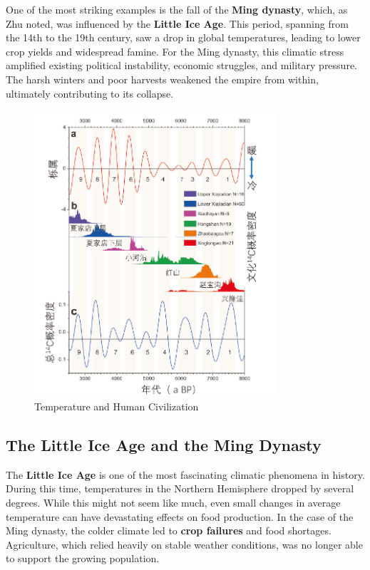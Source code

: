 \documentclass[a4paper]{article} 	%
\begin{document}
One of the most striking examples is the fall of the \textbf{Ming dynasty}, which, as Zhu noted, was influenced by the \textbf{Little Ice Age}. This period, spanning from the 14th to the 19th century, saw a drop in global temperatures, leading to lower crop yields and widespread famine. For the Ming dynasty, this climatic stress amplified existing political instability, economic struggles, and military pressure. The harsh winters and poor harvests weakened the empire from within, ultimately contributing to its collapse.

\begin{figure}[h!]
	\centering
	\includegraphics[width=0.8\textwidth]{fig009.png}  %
	\caption{Temperature and Human Civilization}
	\label{fig:009}
\end{figure}

\subsection*{The Little Ice Age and the Ming Dynasty}

The \textbf{Little Ice Age} is one of the most fascinating climatic phenomena in history. During this time, temperatures in the Northern Hemisphere dropped by several degrees. While this might not seem like much, even small changes in average temperature can have devastating effects on food production. In the case of the Ming dynasty, the colder climate led to \textbf{crop failures} and food shortages. Agriculture, which relied heavily on stable weather conditions, was no longer able to support the growing population.
\end{document}
